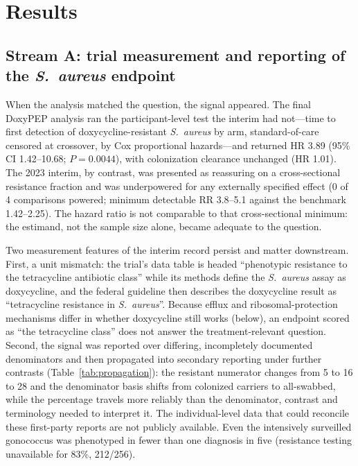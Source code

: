 \documentclass[12pt,a4paper]{article}
\newcommand{\sa}{\emph{S.~aureus}}
\begin{document}
\section*{Results}

\subsection*{Stream A: trial measurement and reporting of the \sa{} endpoint}
When the analysis matched the question, the signal appeared. The final DoxyPEP
analysis ran the participant-level test the interim had not---time to first
detection of doxycycline-resistant \sa{} by arm, standard-of-care censored at
crossover, by Cox proportional hazards---and returned HR 3.89 (95\% CI
1.42--10.68; $P=0.0044$), with colonization clearance unchanged (HR
1.01).\cite{luetkemeyer2025} The 2023 interim, by contrast, was presented as reassuring
on a cross-sectional resistance fraction and was underpowered for any externally
specified effect (0 of 4 comparisons powered; minimum detectable RR 3.8--5.1
against the benchmark 1.42--2.25). The hazard ratio is not comparable to that
cross-sectional minimum: the estimand, not the sample size alone, became adequate
to the question.

Two measurement features of the interim record persist and matter downstream.
First, a unit mismatch: the trial's data table is headed ``phenotypic resistance
to the tetracycline antibiotic class'' while its methods define the \sa{} assay
as doxycycline, and the federal guideline then describes the doxycycline result
as ``tetracycline resistance in \sa{}''.\cite{cdc2024doxypep} Because efflux and
ribosomal-protection mechanisms differ in whether doxycycline still works
(below), an endpoint scored as ``the tetracycline class'' does not answer the
treatment-relevant question. Second, the signal was reported over differing,
incompletely documented denominators and then propagated into secondary reporting
under further contrasts (Table~\ref{tab:propagation}): the resistant numerator
changes from 5 to 16 to 28 and the denominator basis shifts from colonized
carriers to all-swabbed, while the percentage travels more reliably than the
denominator, contrast and terminology needed to interpret it. The individual-level
data that could reconcile these first-party reports are not publicly
available.\cite{luetkemeyer2023} Even the intensively surveilled gonococcus was
phenotyped in fewer than one diagnosis in five (resistance testing unavailable for
83\%, 212/256).\cite{luetkemeyer2023croi}
\end{document}
